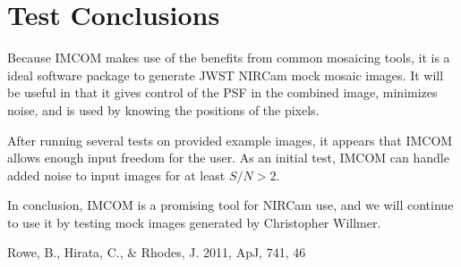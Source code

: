 \documentclass[12pt,preprint]{aastex6}
\begin{document}
\newpage
\section{Test Conclusions}
Because IMCOM \citep[][]{Rowe2011} makes use of the benefits from common mosaicing tools, it is a ideal software package to generate JWST NIRCam mock mosaic images. It will be useful in that it gives control of the PSF in the combined image, minimizes noise, and is used by knowing the positions of the pixels. 

After running several tests on provided example images, it appears that IMCOM allows enough input freedom for the user. As an initial test, IMCOM can handle added noise to input images for at least $S/N>2$. 

In conclusion, IMCOM is a promising tool for NIRCam use, and we will continue to use it by testing mock images generated by Christopher Willmer.




\clearpage
\begin{thebibliography}{}

\def\apj{ApJ}

{Rowe}, B., {Hirata}, C., \& {Rhodes}, J. 2011, \apj, 741, 46

\end{thebibliography}
\end{document}
